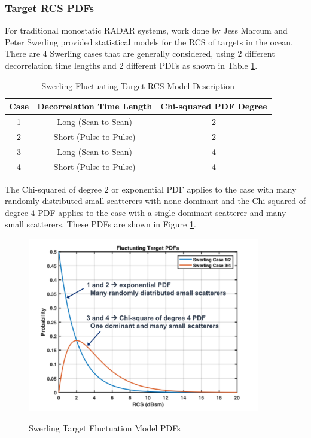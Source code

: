 \subsubsection{Target RCS PDFs}
For traditional monostatic RADAR systems, work done by Jess Marcum and Peter Swerling provided statistical models for the RCS of targets in the ocean\cite{richards_radar}. There are $4$ Swerling cases that are generally considered, using $2$ different decorrelation time lengths and $2$ different PDFs as shown in Table \ref{env_tab:1}. 

\begin{table}[H]
  \begin{center}
      \renewcommand{\baselinestretch}{1} \small\normalsize
  \begin{quote}
    \caption[Swerling Fluctuating Target RCS Model Description]{Swerling Fluctuating Target RCS Model Description\label{env_tab:1}}
  \end{quote}
  \begin{tabular} {|c | c | c |}
    \hline
  \bf{Case} & \bf{Decorrelation Time Length} & \bf{Chi-squared PDF Degree} \\ \hline
  1 &Long (Scan to Scan) &2 \\ \hline
  2 &Short (Pulse to Pulse) &2 \\ \hline
  3 &Long (Scan to Scan) &4 \\ \hline
  4 &Short (Pulse to Pulse) &4 \\ \hline
\end{tabular}
\end{center}
\end{table}
\renewcommand{\baselinestretch}{2} \small\normalsize
The Chi-squared of degree $2$ or exponential PDF applies to the case with many randomly distributed small scatterers with none dominant and the Chi-squared of degree $4$ PDF applies to the case with a single dominant scatterer and many small scatterers. These PDFs are shown in Figure \ref{env_fig:4}.
\begin{figure}[H]
  \begin{center}
\includegraphics[width=4in]{../media/multistatic/swerling_pdfs.png}
  \end{center}
  \renewcommand{\baselinestretch}{1} \small\normalsize
  \begin{quote}
    \caption[Swerling Target Fluctuation Model PDFs]{Swerling Target Fluctuation Model PDFs\label{env_fig:4}}
  \end{quote}
\end{figure}
